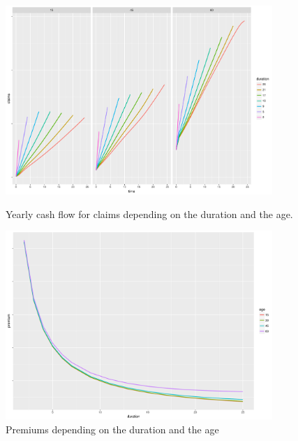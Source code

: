 \begin{figure}
	\centering
	\includegraphics[width=0.9\textwidth]{figures/chapter_sensitivities/sensitivity_duration_claims}
	\caption{Yearly cash flow for claims depending on the duration and the age.}
	\label{fig:sensitivity_duration_claims}
	\centering	
	\includegraphics[width=0.9\textwidth]{figures/chapter_sensitivities/sensitivity_duration_premium}
	\caption{Premiums depending on the duration and the age}
	\label{fig:sensitivity_duration_premium}
\end{figure}



